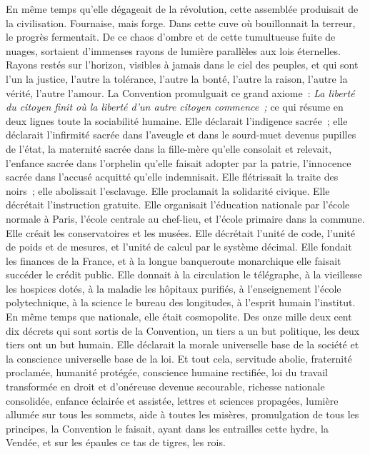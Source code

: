 \documentclass[french,twoside]{book} %
\def\mednobreak{\ifdim\lastskip<\medskipamount
  \removelastskip\nopagebreak\medskip\fi}
\newcommand{\labelblock}[1]{\medbreak{\noindent\color{rubric}\bfseries #1}\par\mednobreak}
\begin{document}
\labelblock{ix}

\noindent En même temps qu’elle dégageait de la révolution, cette assemblée produisait de la civilisation. Fournaise, mais forge. Dans cette cuve où bouillonnait la terreur, le progrès fermentait. De ce chaos d’ombre et de cette tumultueuse fuite de nuages, sortaient d’immenses rayons de lumière parallèles aux lois éternelles. Rayons restés sur l’horizon, visibles à jamais dans le ciel des peuples, et qui sont l’un la justice, l’autre la tolérance, l’autre la bonté, l’autre la raison, l’autre la vérité, l’autre l’amour. La Convention promulguait ce grand axiome : \emph{La liberté du citoyen finit où la liberté d’un autre citoyen commence ;} ce qui résume en deux lignes toute la sociabilité humaine. Elle déclarait l’indigence sacrée ; elle déclarait l’infirmité sacrée dans l’aveugle et dans le sourd-muet devenus pupilles de l’état, la maternité sacrée dans la fille-mère qu’elle consolait et relevait, l’enfance sacrée dans l’orphelin qu’elle faisait adopter par la patrie, l’innocence sacrée dans l’accusé acquitté qu’elle indemnisait. Elle  flétrissait la traite des noirs ; elle abolissait l’esclavage. Elle proclamait la solidarité civique. Elle décrétait l’instruction gratuite. Elle organisait l’éducation nationale par l’école normale à Paris, l’école centrale au chef-lieu, et l’école primaire dans la commune. Elle créait les conservatoires et les musées. Elle décrétait l’unité de code, l’unité de poids et de mesures, et l’unité de calcul par le système décimal. Elle fondait les finances de la France, et à la longue banqueroute monarchique elle faisait succéder le crédit public. Elle donnait à la circulation le télégraphe, à la vieillesse les hospices dotés, à la maladie les hôpitaux purifiés, à l’enseignement l’école polytechnique, à la science le bureau des longitudes, à l’esprit humain l’institut. En même temps que nationale, elle était cosmopolite. Des onze mille deux cent dix décrets qui sont sortis de la Convention, un tiers a un but politique, les deux tiers ont un but humain. Elle déclarait la morale universelle base de la société et la conscience universelle base de la loi. Et tout cela, servitude abolie, fraternité proclamée, humanité protégée, conscience humaine rectifiée, loi du travail transformée en droit et d’onéreuse devenue secourable, richesse nationale consolidée, enfance éclairée et assistée, lettres et sciences propagées, lumière allumée sur tous les sommets, aide à toutes les misères, promulgation de tous les principes, la Convention le faisait, ayant dans les entrailles cette hydre, la Vendée, et sur les épaules ce tas de tigres, les rois.\par
 
\end{document}
